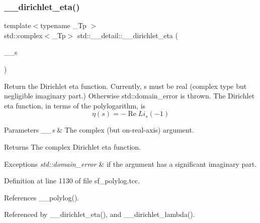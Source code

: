 \subsubsection{\texorpdfstring{\+\_\+\+\_\+dirichlet\+\_\+eta()}{\_\_dirichlet\_eta()}\hspace{0.1cm}{\footnotesize\ttfamily [1/2]}}
{\footnotesize\ttfamily template$<$typename \+\_\+\+Tp $>$ \\
std\+::complex$<$\+\_\+\+Tp$>$ std\+::\+\_\+\+\_\+detail\+::\+\_\+\+\_\+dirichlet\+\_\+eta (\begin{DoxyParamCaption}\item[{std\+::complex$<$ \+\_\+\+Tp $>$}]{\+\_\+\+\_\+s }\end{DoxyParamCaption})}

Return the Dirichlet eta function. Currently, s must be real (complex type but negligible imaginary part.) Otherwise std\+::domain\+\_\+error is thrown. The Dirichlet eta function, in terms of the polylogarithm, is \[ \renewcommand\Re{\operatorname{Re}} \renewcommand\Im{\operatorname{Im}} \eta(s) = -\Re{Li_s(-1)} \]


\begin{DoxyParams}{Parameters}
{\em \+\_\+\+\_\+s} & The complex (but on-\/real-\/axis) argument. \\
\hline
\end{DoxyParams}
\begin{DoxyReturn}{Returns}
The complex Dirichlet eta function. 
\end{DoxyReturn}

\begin{DoxyExceptions}{Exceptions}
{\em std\+::domain\+\_\+error} & if the argument has a significant imaginary part. \\
\hline
\end{DoxyExceptions}


Definition at line 1130 of file sf\+\_\+polylog.\+tcc.



References \+\_\+\+\_\+polylog().



Referenced by \+\_\+\+\_\+dirichlet\+\_\+eta(), and \+\_\+\+\_\+dirichlet\+\_\+lambda().

\mbox{\label{namespacestd_1_1____detail_a88be5bbcdf85bbc487b6b86b5cb65d98}} 

